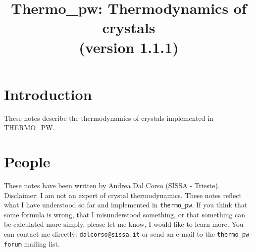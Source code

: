\documentclass[12pt,a4paper]{article}
\def\version{1.1.1}
\def\tpw{{\sc THERMO\_PW}}
\begin{document}
 
\author{}
\date{}


\title{
  \vskip 1cm
  {\color{red} \Huge Thermo\_pw: Thermodynamics of crystals} \\
  \Large (version \version)
}

\maketitle

\tableofcontents

\newpage

\section{{\color{coral}Introduction}}
These notes describe the thermodynamics of crystals implemented in \tpw. 

\newpage
\section{\color{coral}People}
These notes have been written by Andrea Dal Corso (SISSA - Trieste). \\
Disclaimer: I am not an expert of crystal thermodynamics. 
These notes reflect what I have understood so far and implemented in 
\texttt{thermo\_pw}. If you think that some formula is wrong, 
that I misunderstood something, or that something can be calculated more 
simply, please let me know, I would like to learn more. 
You can contact me directly: \texttt{dalcorso@sissa.it} or send an
e-mail to the \texttt{thermo\_pw-forum} mailing list.

\newpage
\end{document}
